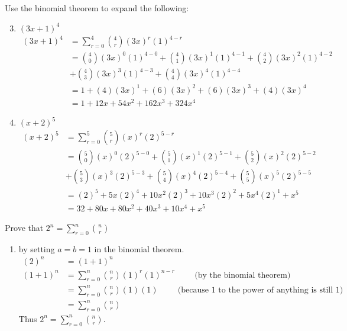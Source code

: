 \documentclass[12pt]{article}
\newcommand{\be}{\begin{enumerate}}
\newcommand{\ee}{\end{enumerate}}
\newcommand{\seti}[1]{\setcounter{enumi}{#1}}
\newcommand{\setii}[1]{\setcounter{enumii}{#1}}
\begin{document}
\seti{8}
\item Use the binomial theorem to expand the following:
	\be
	\setii{2}
	\item $(3x+1)^4$\\
	\begin{align*}
		(3x+1)^4 &= \sum^4_{r=0}{4\choose r}(3x)^r(1)^{4-r}\\
				&= {4\choose0}(3x)^0(1)^{4-0} + {4\choose1}(3x)^1(1)^{4-1} + {4\choose2}(3x)^2(1)^{4-2}\\ &+
				 {4\choose3}(3x)^3(1)^{4-3} + {4\choose4}(3x)^4(1)^{4-4}\\
				&= 1 + (4)(3x)^1 + (6)(3x)^2 + (6)(3x)^3 + (4)(3x)^4 \\
				&= 1 + 12x + 54x^2 + 162x^3 + 324x^4
	\end{align*}
	\item $(x+2)^5$\\
	\begin{align*}
		(x+2)^5 &= \sum^5_{r=0}{5\choose r}(x)^r(2)^{5-r}\\
				&= {5\choose0}(x)^0(2)^{5-0} + {5\choose1}(x)^1(2)^{5-1} + {5\choose2}(x)^2(2)^{5-2} \\&+ 
					{5\choose3}(x)^3(2)^{5-3} + {5\choose4}(x)^4(2)^{5-4} + {5\choose5}(x)^5(2)^{5-5}\\
				&= (2)^5 + 5x(2)^4 + 10x^2(2)^3 + 10x^3(2)^2 + 5x^4(2)^1 + x^5 \\
				&= 32 + 80x + 80x^2 + 40x^3 + 10x^4 + x^5
	\end{align*}
	
	\ee
	

\seti{10}
\item Prove that $2^n = \sum^n_{r=0}{n\choose r}$
	\be
	\item by setting $a=b=1$ in the binomial theorem.
	\begin{align*}
		(2)^n &= (1+1)^n \\
		(1+1)^n &= \sum^n_{r=0}{n\choose r}(1)^r(1)^{n-r} \hspace{1cm}\text{(by the binomial theorem)}\\
				&= \sum^n_{r=0}{n\choose r}(1)(1) \hspace{1cm}\text{(because 1 to the power of anything is still 1)}\\
				&= \sum^n_{r=0}{n\choose r}
	\end{align*}
	Thus $2^n = \sum^n_{r=0}{n\choose r}$. 
	\ee
\end{document}
